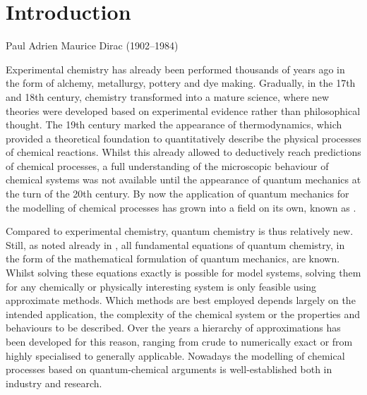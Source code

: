 \chapter{Introduction}
\label{ch:Intro}
{Paul Adrien Maurice Dirac (1902--1984)}

\noindent
Experimental chemistry
has already been performed thousands of years ago
in the form of alchemy, metallurgy, pottery and dye making.
Gradually,
in the 17th and 18th century,
chemistry transformed into a mature science,
where new theories were developed based on
experimental evidence rather than philosophical thought.
The 19th century marked the appearance of thermodynamics,
which provided a theoretical foundation
to quantitatively describe the physical processes of chemical reactions.
Whilst this already allowed to deductively reach predictions of chemical processes,
a full understanding of the microscopic behaviour
of chemical systems was not available until the appearance
of quantum mechanics at the turn of the 20th century.
By now the application of quantum mechanics for the modelling of chemical processes
has grown into a field on its own, known as .

Compared to experimental chemistry, quantum chemistry is thus relatively new.
Still, as \citet{Dirac1929} noted already in \citeyear{Dirac1929},
all fundamental equations of quantum chemistry,
in the form of the mathematical formulation of quantum mechanics, are known.
Whilst solving these equations exactly is possible for model systems,
solving them for any chemically or physically
interesting system is only feasible using approximate methods.
Which methods are best employed depends largely on the intended application,
\ie the complexity of the chemical system
or the properties and behaviours to be described.
Over the years a hierarchy of approximations has been developed for this reason,
ranging from crude to numerically exact
or from highly specialised to generally applicable.
Nowadays the modelling of chemical processes
based on quantum-chemical arguments
is well-established both in industry and research.

